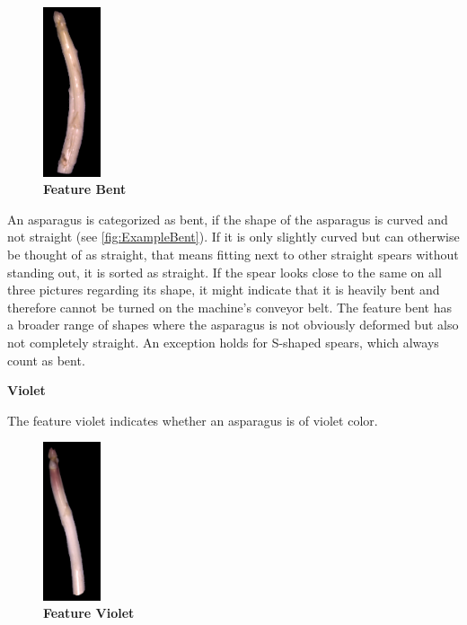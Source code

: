 \begin{figure}
  \vspace{-10pt}
  \begin{center}
    \includegraphics[width=0.15\textwidth]{Figures/chapter03/example_img_bent.png}
  \end{center}
  \vspace{-15pt}
  \caption[Example Image Feature Bent]{ \textbf{Feature Bent}~~~~~~~~}
  \label{fig:ExampleBent}
\end{figure}

An asparagus is categorized as bent, if the shape of the asparagus is curved and not straight (see \autoref{fig:ExampleBent}).
If it is only slightly curved but can otherwise be thought of as straight, that means fitting next to other straight spears without standing out, it is sorted as straight. 
If the spear looks close to the same on all three pictures regarding its shape, it might indicate that it is heavily bent and therefore cannot be turned on the machine’s conveyor belt.
The feature bent has a broader range of shapes where the asparagus is not obviously deformed but also not completely straight. An exception holds for S-shaped spears, which always count as bent.

\bigskip
\textbf{Violet}

The feature violet indicates whether an asparagus is of violet color.

\begin{figure}
  \vspace{-10pt}
  \begin{center}
    \includegraphics[width=0.15\textwidth]{Figures/chapter03/example_img_violet.png}
  \end{center}
  \vspace{-15pt}
  \caption[Example Image Feature Violet]{ \textbf{Feature Violet}}
  \vspace{-130pt}
  \label{fig:ExampleViolet}
\end{figure}

